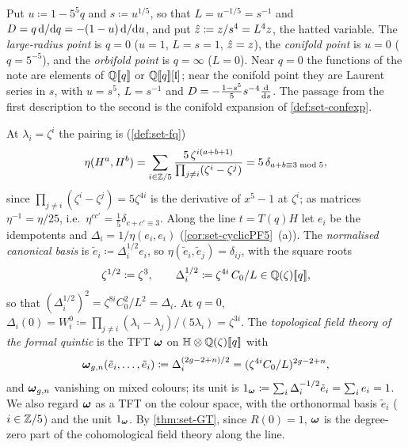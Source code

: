 \begin{defn}
\label{def:set-points}
Put $u\coloneqq1-5^5q$ and $s\coloneqq u^{1/5}$, so that $L=u^{-1/5}=s^{-1}$ and $D=q\,\mathrm{d}/\mathrm{d} q=-(1-u)\,\mathrm{d}/\mathrm{d} u$, and put $\hat{z}\coloneqq z/s^4=L^4z$, the hatted variable. The \emph{large-radius point} is $q=0$ ($u=1$, $L=s=1$, $\hat{z}=z$), the \emph{conifold point} is $u=0$ ($q=5^{-5}$), and the \emph{orbifold point} is $q=\infty$ ($L=0$). Near $q=0$ the functions of the note are elements of $\mathbb{Q}[\![ q ]\!]$ or $\mathbb{Q}[\![ q ]\!][\mathfrak{l}]$; near the conifold point they are Laurent series in $s$, with $u=s^5$, $L=s^{-1}$ and $D=-\frac{1-s^5}5s^{-4}\frac{\mathrm{d}}{\mathrm{d} s}$. The passage from the first description to the second is the conifold expansion of \cref{def:set-confexp}.
\end{defn}

\begin{defn}
\label{def:set-frob}
At $\lambda_i=\zeta^i$ the pairing is (\cref{def:set-fq})
\[
\eta(H^a,H^b)=\sum_{i\in\mathbb{Z}/5}\frac{5\,\zeta^{i(a+b+1)}}{\prod_{j\neq i}(\zeta^i-\zeta^j)}=5\,\delta_{a+b\equiv3\bmod5},
\]
since $\prod_{j\neq i}(\zeta^i-\zeta^j)=5\zeta^{4i}$ is the derivative of $x^5-1$ at $\zeta^i$; as matrices $\eta^{-1}=\eta/25$, i.e.\ $\eta^{cc'}=\frac15\delta_{c+c'\equiv3}$. Along the line $t=T(q)H$ let $e_i$ be the idempotents and $\Delta_i=1/\eta(e_i,e_i)$ (\cref{cor:set-cyclicPF5}~(a)). The \emph{normalised canonical basis} is $\tilde e_i\coloneqq\Delta_i^{1/2}e_i$, so $\eta(\tilde e_i,\tilde e_j)=\delta_{ij}$, with the square roots
\[
\zeta^{1/2}\coloneqq\zeta^3,\qquad\Delta_i^{1/2}\coloneqq\zeta^{4i}\,C_0/L\in\mathbb{Q}(\zeta)[\![ q ]\!],
\]
so that $(\Delta_i^{1/2})^2=\zeta^{8i}C_0^2/L^2=\Delta_i$. At $q=0$, $\Delta_i(0)=W^0_i\coloneqq\prod_{j\neq i}(\lambda_i-\lambda_j)/(5\lambda_i)=\zeta^{3i}$. The \emph{topological field theory of the formal quintic} is the TFT $\boldsymbol{\omega}$ on $\mathbb{H}\otimes\mathbb{Q}(\zeta)[\![ q ]\!]$ with
\[
\boldsymbol{\omega}_{g,n}(\tilde e_i,\dots,\tilde e_i)\coloneqq\Delta_i^{(2g-2+n)/2}=(\zeta^{4i}C_0/L)^{2g-2+n},
\]
and $\boldsymbol{\omega}_{g,n}$ vanishing on mixed colours; its unit is $1_{\boldsymbol{\omega}}\coloneqq\sum_i\Delta_i^{-1/2}\tilde e_i=\sum_ie_i=1$. We also regard $\boldsymbol{\omega}$ as a TFT on the colour space, with the orthonormal basis $\tilde e_i$ ($i\in\mathbb{Z}/5$) and the unit $1_{\boldsymbol{\omega}}$. By \cref{thm:set-GT}, since $R(0)=1$, $\boldsymbol{\omega}$ is the degree-zero part of the cohomological field theory along the line.
\end{defn}


